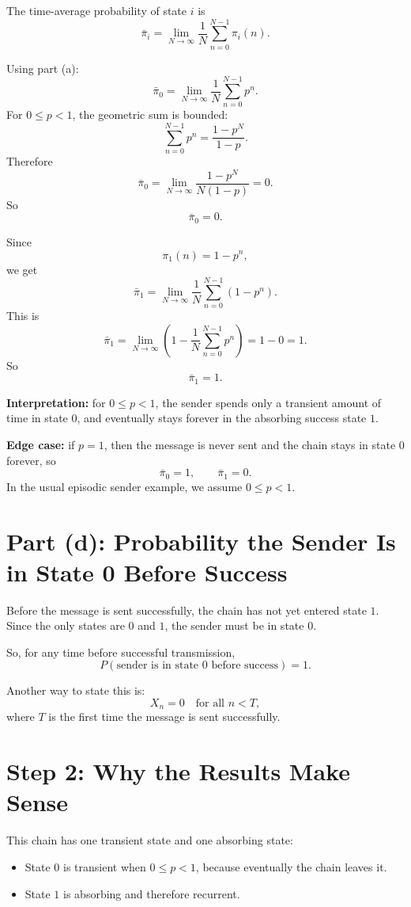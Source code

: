 \documentclass[11pt]{article}
\begin{document}
The time-average probability of state \(i\) is
\[
\bar\pi_i
=
\lim_{N\to\infty}\frac{1}{N}\sum_{n=0}^{N-1}\pi_i(n).
\]

Using part (a):
\[
\bar\pi_0
=
\lim_{N\to\infty}\frac{1}{N}\sum_{n=0}^{N-1}p^n.
\]
For \(0\le p<1\), the geometric sum is bounded:
\[
\sum_{n=0}^{N-1}p^n=\frac{1-p^N}{1-p}.
\]
Therefore
\[
\bar\pi_0
=
\lim_{N\to\infty}
\frac{1-p^N}{N(1-p)}
=0.
\]
So
\[
\boxed{\bar\pi_0=0.}
\]

Since
\[
\pi_1(n)=1-p^n,
\]
we get
\[
\bar\pi_1
=
\lim_{N\to\infty}\frac{1}{N}\sum_{n=0}^{N-1}(1-p^n).
\]
This is
\[
\bar\pi_1
=
\lim_{N\to\infty}
\left(
1-\frac{1}{N}\sum_{n=0}^{N-1}p^n
\right)
=1-0=1.
\]
So
\[
\boxed{\bar\pi_1=1.}
\]

\textbf{Interpretation:} for \(0\le p<1\), the sender spends only a transient amount of time in state \(0\), and eventually stays forever in the absorbing success state \(1\).

\textbf{Edge case:} if \(p=1\), then the message is never sent and the chain stays in state \(0\) forever, so
\[
\bar\pi_0=1,\qquad \bar\pi_1=0.
\]
In the usual episodic sender example, we assume \(0\le p<1\).

\section*{Part (d): Probability the Sender Is in State 0 Before Success}

Before the message is sent successfully, the chain has not yet entered state \(1\). Since the only states are \(0\) and \(1\), the sender must be in state \(0\).

So, for any time before successful transmission,
\[
\boxed{P(\text{sender is in state }0\text{ before success})=1.}
\]

Another way to state this is:
\[
X_n=0 \quad \text{for all } n<T,
\]
where \(T\) is the first time the message is sent successfully.

\section*{Step 2: Why the Results Make Sense}

This chain has one transient state and one absorbing state:
\begin{itemize}
\item State \(0\) is transient when \(0\le p<1\), because eventually the chain leaves it.
\item State \(1\) is absorbing and therefore recurrent.
\end{itemize}
\end{document}
